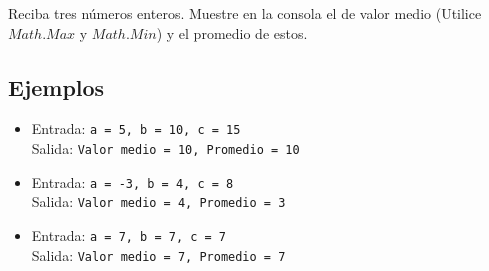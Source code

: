 Reciba tres números enteros. Muestre en la consola el de valor medio (Utilice $Math.Max$ y $Math.Min$) y el promedio de estos.
\subsection*{Ejemplos}
\begin{itemize}
    \item Entrada: \texttt{a = 5, b = 10, c = 15}\\
        Salida: \texttt{Valor medio = 10, Promedio = 10}
    \item Entrada: \texttt{a = -3, b = 4, c = 8}\\
        Salida: \texttt{Valor medio = 4, Promedio = 3}
    \item Entrada: \texttt{a = 7, b = 7, c = 7}\\
        Salida: \texttt{Valor medio = 7, Promedio = 7}
\end{itemize}